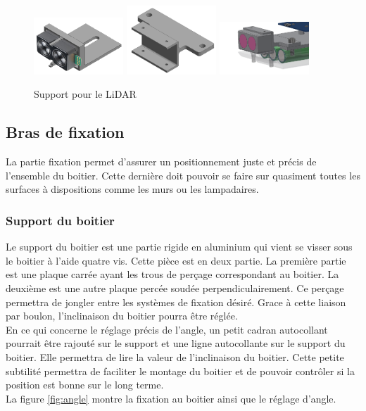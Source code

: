 \begin{figure}[H]
    \centering
    \includegraphics[width=0.3\textwidth]{Images/photos_PGA/lidar dans support.png}
    \includegraphics[width=0.3\textwidth]{Images/photos_PGA/supportLidar2.PNG}
    \includegraphics[width=0.3\textwidth]{Images/photos_PGA/supportlidar.PNG}
    \caption{Support pour le LiDAR}
    \label{fig:supportlidar}
\end{figure}

\subsection{Bras de fixation}

La partie fixation permet d’assurer un positionnement juste et précis de l’ensemble du boitier. Cette 
dernière doit pouvoir se faire sur quasiment toutes les surfaces à dispositions comme les murs ou les 
lampadaires.

\subsubsection{Support du boitier}

Le support du boitier est une partie rigide en aluminium qui vient se visser sous le boitier à l’aide 
quatre vis. Cette pièce est en deux partie. La première partie est une plaque carrée ayant les trous de 
perçage correspondant au boitier. La deuxième est une autre plaque percée soudée perpendiculairement.
Ce perçage permettra de jongler entre les systèmes de fixation désiré. Grace à cette liaison par boulon, 
l’inclinaison du boitier pourra être réglée.\\
En ce qui concerne le réglage précis de l’angle, un petit cadran autocollant pourrait être rajouté 
sur le support et une ligne autocollante sur le support du boitier. Elle permettra de lire la valeur 
de l’inclinaison du boitier. Cette petite subtilité permettra de faciliter le montage du boitier et 
de pouvoir contrôler si la position est bonne sur le long terme.\\
La figure \ref{fig:angle} montre la fixation au boitier ainsi que le réglage d'angle.

